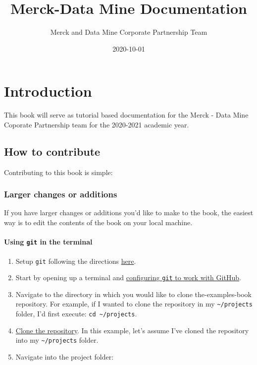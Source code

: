 \documentclass[]{book}
\title{Merck-Data Mine Documentation}
\author{Merck and Data Mine Corporate Partnership Team}
\date{2020-10-01}
\providecommand{\tightlist}{%
  \setlength{\itemsep}{0pt}\setlength{\parskip}{0pt}}
\begin{document}
\maketitle

{
\setcounter{tocdepth}{1}
\tableofcontents
}
\chapter{Introduction}\label{introduction}

This book will serve as tutorial based documentation for the Merck -
Data Mine Coporate Partnership team for the 2020-2021 academic year.

\section{How to contribute}\label{how-to-contribute}

Contributing to this book is simple:

\subsection{Larger changes or
additions}\label{larger-changes-or-additions}

If you have larger changes or additions you'd like to make to the book,
the easiest way is to edit the contents of the book on your local
machine.

\subsubsection{\texorpdfstring{Using \texttt{git} in the
terminal}{Using git in the terminal}}\label{using-git-in-the-terminal}

\begin{enumerate}
\def\labelenumi{\arabic{enumi}.}
\tightlist
\item
  Setup \texttt{git} following the directions
  \protect\hyperlink{git-install}{here}.
\item
  Start by opening up a terminal and
  \protect\hyperlink{configure-git}{configuring \texttt{git} to work
  with GitHub}.
\item
  Navigate to the directory in which you would like to clone
  the-examples-book repository. For example, if I wanted to clone the
  repository in my \texttt{\textasciitilde{}/projects} folder, I'd first
  execute: \texttt{cd\ \textasciitilde{}/projects}.
\item
  \protect\hyperlink{git-clone-repository}{Clone the repository}. In
  this example, let's assume I've cloned the repository into my
  \texttt{\textasciitilde{}/projects} folder.
\item
  Navigate into the project folder:
\end{enumerate}
\end{document}
